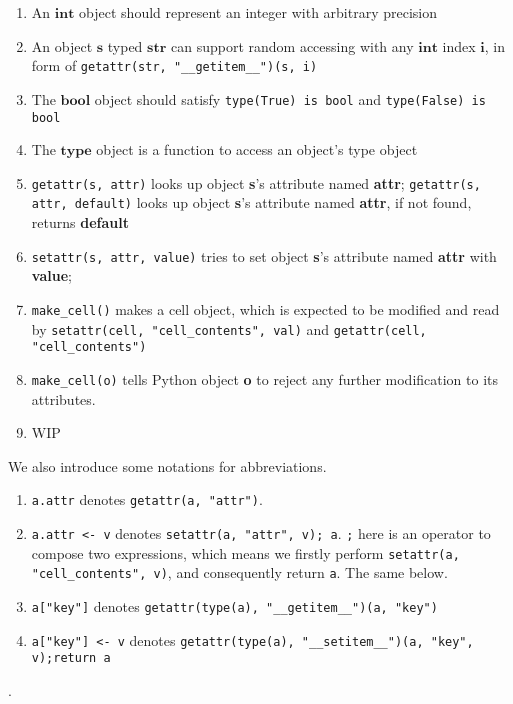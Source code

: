 \documentclass[12pt, a4paper]{report}
\begin{document}
\begin{enumerate}
\item An $\mathbf{int}$ object should represent an integer with arbitrary precision
\item An object $\mathbf{s}$ typed $\mathbf{str}$
can support random accessing with any $\mathbf{int}$ index $\mathbf{i}$,
in form of \lstinline!getattr(str, "__getitem__")(s, i)!
\item The $\mathbf{bool}$ object should satisfy \lstinline!type(True) is bool! and \lstinline!type(False) is bool!
\item The $\mathbf{type}$ object is a function to access an object's type object
\item \lstinline!getattr(s, attr)! looks up object \textbf{s}'s attribute named \textbf{attr};
      \lstinline!getattr(s, attr, default)! looks up object \textbf{s}'s attribute named \textbf{attr},
      if not found, returns \textbf{default}
\item \lstinline!setattr(s, attr, value)! tries to set object \textbf{s}'s attribute named \textbf{attr} with \textbf{value};
\item \lstinline!make_cell()! makes a cell object,
      which is expected to be modified and read by
      \lstinline!setattr(cell, "cell_contents", val)!
      and \lstinline!getattr(cell, "cell_contents")!
\item \lstinline!make_cell(o)! tells Python object \textbf{o} to reject any further modification to its attributes.
\item WIP
\end{enumerate}

We also introduce some notations for abbreviations.

\begin{enumerate}
\item \lstinline!a.attr! denotes \lstinline!getattr(a, "attr")!.
\item \lstinline!a.attr <- v! denotes \lstinline!setattr(a, "attr", v); a!.
\lstinline!;! here is an operator to compose two expressions,
which means we firstly perform \lstinline!setattr(a, "cell_contents", v)!, and consequently return \lstinline!a!.
The same below.
\item \lstinline!a["key"]! denotes \lstinline!getattr(type(a), "__getitem__")(a, "key")!
\item \lstinline!a["key"] <- v! denotes \lstinline!getattr(type(a), "__setitem__")(a, "key", v);return a!
\end{enumerate}.
\end{document}
